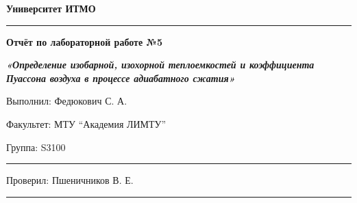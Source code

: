 \documentclass[12pt]{article}
\begin{document}
\pagestyle{empty}
\begin{center}
\large{\textbf{Университет ИТМО}}
\end{center}
\rule{500pt}{1pt}
\par\bigskip\par\bigskip\par\bigskip\par\bigskip\par\bigskip\par\bigskip\par\bigskip\par\bigskip
\begin{center}
\Large
\textbf{Отчёт по лабораторной работе №5}

\textbf{\textit{«Определение изобарной, изохорной теплоемкостей и коэффициента Пуассона воздуха в процессе адиабатного сжатия»}}


\end{center}
\par\bigskip\par\bigskip\par\bigskip\par\bigskip\par\bigskip\par\bigskip\par\bigskip\par\bigskip\par\bigskip\par\bigskip\par\bigskip\par\bigskip\par\bigskip\par\bigskip      
\begin{flushright}
\large
Выполнил: Федюкович С. А.
\par\bigskip
Факультет: МТУ “Академия ЛИМТУ”
\par\bigskip
Группа: S3100                       
\par\bigskip\par\bigskip\par\bigskip

\rule{150pt}{0.5pt}
\par\bigskip\par\bigskip\par\bigskip\par\bigskip                                                            
 Проверил: Пшеничников В. Е. 
\par\bigskip \par\bigskip

\rule{150pt}{0.5pt}
\end{flushright}
\end{document}
